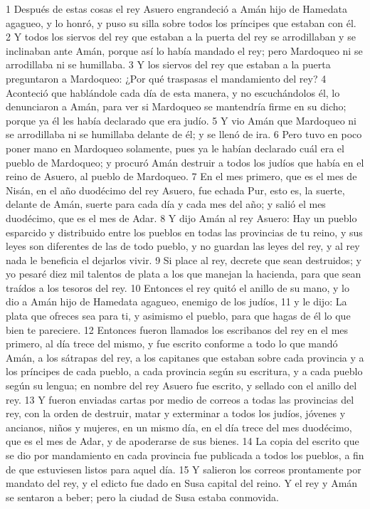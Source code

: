 1 Después de estas cosas el rey Asuero engrandeció a Amán hijo de Hamedata agagueo, y lo honró, y puso su silla sobre todos los príncipes que estaban con él.
2 Y todos los siervos del rey que estaban a la puerta del rey se arrodillaban y se inclinaban ante Amán, porque así lo había mandado el rey; pero Mardoqueo ni se arrodillaba ni se humillaba.
3 Y los siervos del rey que estaban a la puerta preguntaron a Mardoqueo: ¿Por qué traspasas el mandamiento del rey?
4 Aconteció que hablándole cada día de esta manera, y no escuchándolos él, lo denunciaron a Amán, para ver si Mardoqueo se mantendría firme en su dicho; porque ya él les había declarado que era judío.
5 Y vio Amán que Mardoqueo ni se arrodillaba ni se humillaba delante de él; y se llenó de ira.
6 Pero tuvo en poco poner mano en Mardoqueo solamente, pues ya le habían declarado cuál era el pueblo de Mardoqueo; y procuró Amán destruir a todos los judíos que había en el reino de Asuero, al pueblo de Mardoqueo.
7 En el mes primero, que es el mes de Nisán, en el año duodécimo del rey Asuero, fue echada Pur, esto es, la suerte, delante de Amán, suerte para cada día y cada mes del año; y salió el mes duodécimo, que es el mes de Adar.
8 Y dijo Amán al rey Asuero: Hay un pueblo esparcido y distribuido entre los pueblos en todas las provincias de tu reino, y sus leyes son diferentes de las de todo pueblo, y no guardan las leyes del rey, y al rey nada le beneficia el dejarlos vivir.
9 Si place al rey, decrete que sean destruidos; y yo pesaré diez mil talentos de plata   a los que manejan la hacienda, para que sean traídos a los tesoros del rey.
10 Entonces el rey quitó el anillo de su mano, y lo dio a Amán hijo de Hamedata agagueo, enemigo de los judíos,
11 y le dijo: La plata que ofreces sea para ti, y asimismo el pueblo, para que hagas de él lo que bien te pareciere.
12 Entonces fueron llamados los escribanos del rey en el mes primero, al día trece del mismo, y fue escrito conforme a todo lo que mandó Amán, a los sátrapas del rey, a los capitanes que estaban sobre cada provincia y a los príncipes de cada pueblo, a cada provincia según su escritura, y a cada pueblo según su lengua; en nombre del rey Asuero fue escrito, y sellado con el anillo del rey.
13 Y fueron enviadas cartas por medio de correos a todas las provincias del rey, con la orden de destruir, matar y exterminar a todos los judíos, jóvenes y ancianos, niños y mujeres, en un mismo día, en el día trece del mes duodécimo, que es el mes de Adar, y de apoderarse de sus bienes.
14 La copia del escrito que se dio por mandamiento en cada provincia fue publicada a todos los pueblos, a fin de que estuviesen listos para aquel día.
15 Y salieron los correos prontamente por mandato del rey, y el edicto fue dado en Susa capital del reino. Y el rey y Amán se sentaron a beber; pero la ciudad de Susa estaba conmovida.

